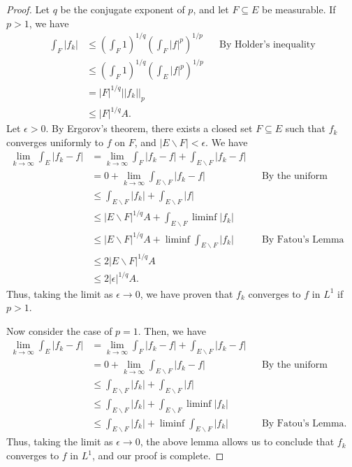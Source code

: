 \documentclass[10pt,a4paper]{article}
\theoremstyle{theorem}
\theoremstyle{definition}
\begin{document}
\begin{proof}
Let $q$ be the conjugate exponent of $p$, and let $F \subseteq E$ be measurable. If $p > 1$, we have
\begin{align*}
\int_F |f_k| &\leq \left( \int_F 1 \right)^{1/q} \left( \int_F |f|^p \right)^{1/p} &&\text{By Holder's inequality}\\
&\leq \left( \int_F 1 \right)^{1/q} \left( \int_E |f|^p \right)^{1/p}\\
&= |F|^{1/q} ||f_k||_p\\
&\leq |F|^{1/q} A.
\end{align*}
Let $\epsilon > 0$. By Ergorov's theorem, there exists a closed set $F \subseteq E$ such that $f_k$ converges uniformly to $f$ on $F$, and $|E \backslash F| < \epsilon$. We have
\begin{align*}
\lim_{k \to \infty} \int_E |f_k - f| &= \lim_{k \to \infty} \int_{F} |f_k - f| + \int_{E \backslash F} |f_k - f|\\
&= 0 + \lim_{k \to \infty} \int_{E \backslash F} |f_k - f| &&\text{By the uniform convergence theorem}\\
&\leq \int_{E \backslash F} |f_k| + \int_{E \backslash F} |f|\\
&\leq |E \backslash F|^{1/q} A + \int_{E \backslash F} \liminf |f_k|\\
&\leq |E \backslash F|^{1/q} A + \liminf \int_{E \backslash F} |f_k| &&\text{By Fatou's Lemma}\\
&\leq 2 |E \backslash F|^{1/q} A\\
&\leq 2|\epsilon|^{1/q} A.
\end{align*}
Thus, taking the limit as $\epsilon \to 0$, we have proven that $f_k$ converges to $f$ in $L^1$ if $p > 1$.

Now consider the case of $p = 1$. Then, we have
\begin{align*}
\lim_{k \to \infty} \int_E |f_k - f| &= \lim_{k \to \infty} \int_{F} |f_k - f| + \int_{E \backslash F} |f_k - f|\\
&= 0 + \lim_{k \to \infty} \int_{E \backslash F} |f_k - f| &&\text{By the uniform convergence theorem}\\
&\leq \int_{E \backslash F} |f_k| + \int_{E \backslash F} |f|\\
&\leq \int_{E \backslash F} |f_k| + \int_{E \backslash F} \liminf |f_k|\\
&\leq \int_{E \backslash F} |f_k| + \liminf \int_{E \backslash F} |f_k| &&\text{By Fatou's Lemma}.
\end{align*}
Thus, taking the limit as $\epsilon \to 0$, the above lemma allows us to conclude that $f_k$ converges to $f$ in $L^1$, and our proof is complete.
\end{proof}
\end{document}
